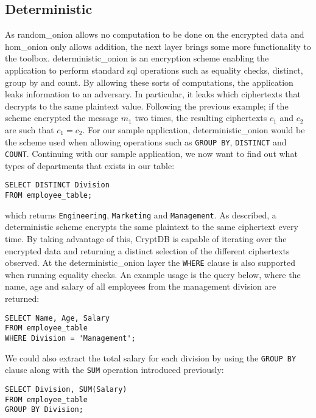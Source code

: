\subsection{Deterministic}
\label{sec:det}

As \Gls{random_onion} allows no computation to be done on the encrypted data and \gls{hom_onion} only allows addition, the next layer brings some more functionality to the toolbox. \Gls{deterministic_onion} is an encryption scheme enabling the application to perform standard \gls{sql} operations such as equality checks, distinct, group by and count. By allowing these sorts of computations, the application leaks information to an adversary. In particular, it leaks which ciphertexts that decrypts to the same plaintext value. Following the previous example; if the scheme encrypted the message $m_1$ two times, the resulting ciphertexts $c_1$ and $c_2$ are such that $c_1 = c_2$. For our sample application, \Gls{deterministic_onion} would be the scheme used when allowing operations such as \verb!GROUP BY!, \verb!DISTINCT! and \verb!COUNT!. Continuing with our sample application, we now want to find out what types of departments that exists in our table:

\begin{verbatim}
SELECT DISTINCT Division
FROM employee_table;
\end{verbatim}
\noindent
which returns \verb!Engineering!, \verb!Marketing! and \verb!Management!. As described, a deterministic scheme encrypts the same plaintext to the same ciphertext every time. By taking advantage of this, CryptDB is capable of iterating over the encrypted data and returning a distinct selection of the different ciphertexts observed. At the \gls{deterministic_onion} layer the \verb!WHERE! clause is also supported when running equality checks. An example usage is the query below, where the name, age and salary of all employees from the management division are returned:

\begin{verbatim}
SELECT Name, Age, Salary
FROM employee_table
WHERE Division = 'Management';
\end{verbatim}

\noindent
We could also extract the total salary for each division by using the \verb!GROUP BY! clause along with the \verb!SUM! operation introduced previously:

\begin{verbatim}
SELECT Division, SUM(Salary)
FROM employee_table
GROUP BY Division;
\end{verbatim}

